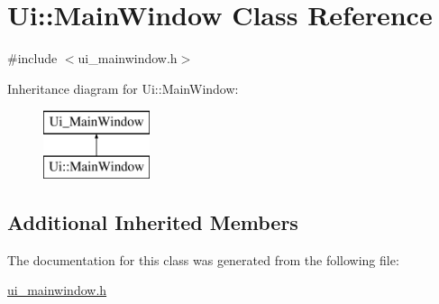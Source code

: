 \hypertarget{class_ui_1_1_main_window}{}\section{Ui\+:\+:Main\+Window Class Reference}
\label{class_ui_1_1_main_window}


{\ttfamily \#include $<$ui\+\_\+mainwindow.\+h$>$}

Inheritance diagram for Ui\+:\+:Main\+Window\+:\begin{figure}[H]
\begin{center}
\leavevmode
\includegraphics[height=2.000000cm]{class_ui_1_1_main_window}
\end{center}
\end{figure}
\subsection*{Additional Inherited Members}


The documentation for this class was generated from the following file\+:\begin{DoxyCompactItemize}
\item 
\mbox{\hyperlink{ui__mainwindow_8h}{ui\+\_\+mainwindow.\+h}}\end{DoxyCompactItemize}
